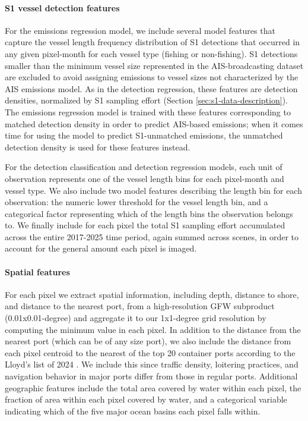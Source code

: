 \documentclass[lineno,pdflatex,sn-nature]{sn-jnl}
\begin{document}
\paragraph{S1 vessel detection features}

For the emissions regression model, we include several model features that capture the vessel length frequency distribution of S1 detections that occurred in any given pixel-month for each vessel type (fishing or non-fishing). S1 detections smaller than the minimum vessel size represented in the AIS-broadcasting dataset are excluded to avoid assigning emissions to vessel sizes not characterized by the AIS emissions model. As in the detection regression, these features are detection densities, normalized by S1 sampling effort (Section \ref{sec:s1-data-description}). The emissions regression model is trained with these features corresponding to matched detection density in order to predict AIS-based emissions; when it comes time for using the model to predict S1-unmatched emissions, the unmatched detection density is used for these features instead.

For the detection classification and detection regression models, each unit of observation represents one of the vessel length bins for each pixel-month and vessel type. We also include two model features describing the length bin for each observation: the numeric lower threshold for the vessel length bin, and a categorical factor representing which of the length bins the observation belongs to. We finally include for each pixel the total S1 sampling effort accumulated across the entire 2017-2025 time period, again summed across scenes, in order to account for the general amount each pixel is imaged. 


\paragraph{Spatial features}

For each pixel we extract spatial information, including depth, distance to shore, and distance to the nearest port, from a high-resolution GFW subproduct (0.01x0.01-degree) and aggregate it to our 1x1-degree grid resolution by computing the minimum value in each pixel. In addition to the distance from the nearest port (which can be of any size port), we also include the distance from each pixel centroid to the nearest of the top 20 container ports according to the Lloyd's list of 2024 \cite{LloydsListTopPorts2024}. We include this since traffic density, loitering practices, and navigation behavior in major ports differ from those in regular ports. Additional geographic features include the total area covered by water within each pixel, the fraction of area within each pixel covered by water, and a categorical variable indicating which of the five major ocean basins each pixel falls within.
\end{document}
